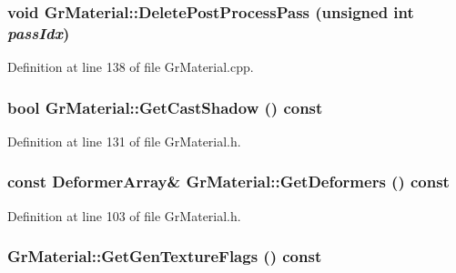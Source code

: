 \begin{CompactItemize}
{\subsubsection[{DeletePostProcessPass}]{\setlength{\rightskip}{0pt plus 5cm}void GrMaterial::DeletePostProcessPass (unsigned int {\em passIdx})}}
\label{class_gr_material_fc785b8aa612256266c37eb1d482f287}




Definition at line 138 of file GrMaterial.cpp.\hypertarget{class_gr_material_1d5920d3a45dfcf1f233209ec74c5fa8}{
\subsubsection[{GetCastShadow}]{\setlength{\rightskip}{0pt plus 5cm}bool GrMaterial::GetCastShadow () const}}
\label{class_gr_material_1d5920d3a45dfcf1f233209ec74c5fa8}




Definition at line 131 of file GrMaterial.h.\hypertarget{class_gr_material_9d986c1ed00c9c7f3212c9d1f1233582}{
\subsubsection[{GetDeformers}]{\setlength{\rightskip}{0pt plus 5cm}const {\bf DeformerArray}\& GrMaterial::GetDeformers () const}}
\label{class_gr_material_9d986c1ed00c9c7f3212c9d1f1233582}




Definition at line 103 of file GrMaterial.h.\hypertarget{class_gr_material_7751843be737d70abaf404d4955c9000}{
\subsubsection[{GetGenTextureFlags}]{ GrMaterial::GetGenTextureFlags () const}}
\label{class_gr_material_7751843be737d70abaf404d4955c9000}





\end{CompactItemize}
